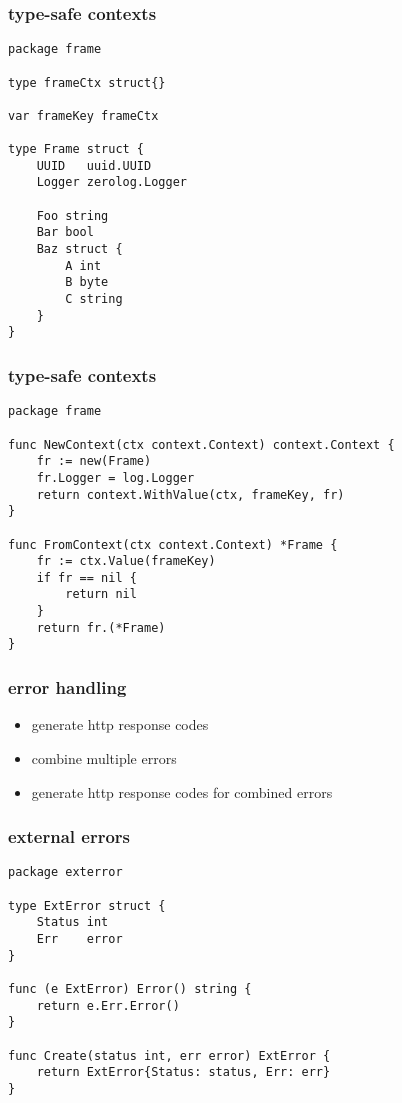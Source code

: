 \documentclass{beamer}
\begin{document}
\begin{frame}[fragile]
\frametitle{type-safe contexts}
\begin{lstlisting}[basicstyle=\ttfamily\footnotesize]
package frame

type frameCtx struct{}

var frameKey frameCtx

type Frame struct {
	UUID   uuid.UUID
	Logger zerolog.Logger

	Foo string
	Bar bool
	Baz struct {
		A int
		B byte
		C string
	}
}
\end{lstlisting}
\end{frame}


\begin{frame}[fragile]
\frametitle{type-safe contexts}
\begin{lstlisting}[basicstyle=\ttfamily\footnotesize]
package frame

func NewContext(ctx context.Context) context.Context {
	fr := new(Frame)
	fr.Logger = log.Logger
	return context.WithValue(ctx, frameKey, fr)
}

func FromContext(ctx context.Context) *Frame {
	fr := ctx.Value(frameKey)
	if fr == nil {
		return nil
	}
	return fr.(*Frame)
}
\end{lstlisting}
\end{frame}

\begin{frame}
\frametitle{error handling}
\begin{itemize}
\item generate http response codes
\item combine multiple errors
\item generate http response codes for combined errors
\end{itemize}
\end{frame}

\begin{frame}[fragile]
\frametitle{external errors}
\begin{lstlisting}[basicstyle=\ttfamily\footnotesize]
package exterror

type ExtError struct {
	Status int
	Err    error
}

func (e ExtError) Error() string {
	return e.Err.Error()
}

func Create(status int, err error) ExtError {
	return ExtError{Status: status, Err: err}
}
\end{lstlisting}
\end{frame}
\end{document}
